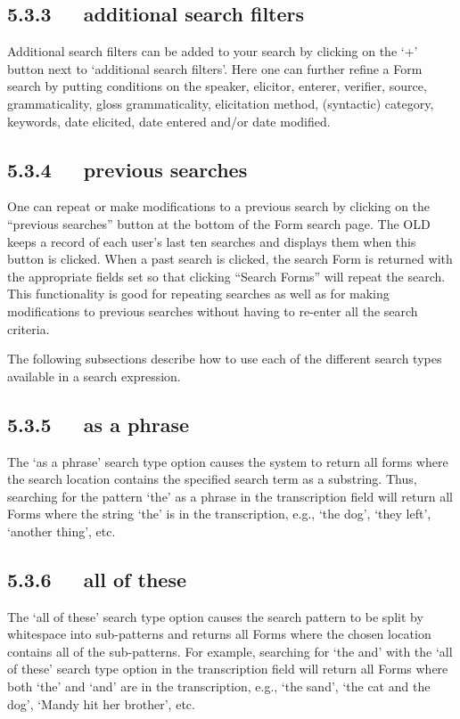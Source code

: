 \documentclass[letterpaper,10pt,english]{sphinxmanual}
\begin{document}
\subsection{5.3.3   additional search filters}
\label{documentation:additional-search-filters}
Additional search filters can be added to your search by clicking on the `+'
button next to `additional search filters'.  Here one can further refine a
Form search by putting conditions on the speaker, elicitor, enterer, verifier,
source, grammaticality, gloss grammaticality, elicitation method, (syntactic)
category, keywords, date elicited, date entered and/or date modified.


\subsection{5.3.4   previous searches}
\label{documentation:previous-searches}
One can repeat or make modifications to a previous search by clicking
on the ``previous searches'' button at the bottom of the Form search page.  The
OLD keeps a record of each user's last ten searches and displays them when this
button is clicked.  When a past search is clicked, the search Form is returned
with the appropriate fields set so that clicking ``Search Forms'' will repeat the
search.  This functionality is good for repeating searches as well as for making
modifications to previous searches without having to re-enter all the search
criteria.

The following subsections describe how to use each of the different search types
available in a search expression.


\subsection{5.3.5   as a phrase}
\label{documentation:as-a-phrase}
The `as a phrase' search type option causes the system to return all forms where
the search location contains the specified search term as a substring.  Thus,
searching for the pattern `the' as a phrase in the transcription field will
return all Forms where the string `the' is in the transcription, e.g., `the
dog', `they left', `another thing', etc.


\subsection{5.3.6   all of these}
\label{documentation:all-of-these}
The `all of these' search type option causes the search pattern to be split by
whitespace into sub-patterns and returns all Forms where the chosen location
contains all of the sub-patterns.  For example, searching for `the and' with the
`all of these' search type option in the transcription field will return all
Forms where both `the' and `and' are in the transcription, e.g., `the sand',
`the cat and the dog', `Mandy hit her brother', etc.
\end{document}
